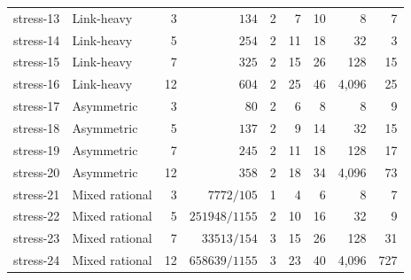 \begin{tabular}{llrrrrrrr}
stress-13 & Link-heavy & 3 & $134$ & 2 & 7 & 10 & 8 & 7\\
stress-14 & Link-heavy & 5 & $254$ & 2 & 11 & 18 & 32 & 3\\
stress-15 & Link-heavy & 7 & $325$ & 2 & 15 & 26 & 128 & 15\\
stress-16 & Link-heavy & 12 & $604$ & 2 & 25 & 46 & 4,096 & 25\\
stress-17 & Asymmetric & 3 & $80$ & 2 & 6 & 8 & 8 & 9\\
stress-18 & Asymmetric & 5 & $137$ & 2 & 9 & 14 & 32 & 15\\
stress-19 & Asymmetric & 7 & $245$ & 2 & 11 & 18 & 128 & 17\\
stress-20 & Asymmetric & 12 & $358$ & 2 & 18 & 34 & 4,096 & 73\\
stress-21 & Mixed rational & 3 & $7772/105$ & 1 & 4 & 6 & 8 & 7\\
stress-22 & Mixed rational & 5 & $251948/1155$ & 2 & 10 & 16 & 32 & 9\\
stress-23 & Mixed rational & 7 & $33513/154$ & 3 & 15 & 26 & 128 & 31\\
stress-24 & Mixed rational & 12 & $658639/1155$ & 3 & 23 & 40 & 4,096 & 727\\
\bottomrule
\end{tabular}
